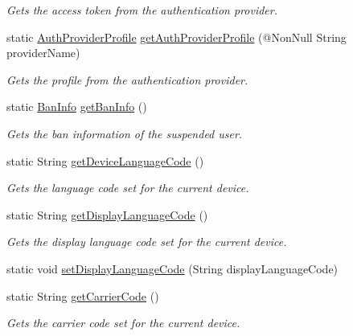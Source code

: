 \begin{DoxyCompactItemize}
\begin{DoxyCompactList}\small\item\em Gets the access token from the authentication provider. \end{DoxyCompactList}\item 
static \hyperlink{classcom_1_1toast_1_1android_1_1gamebase_1_1base_1_1auth_1_1_auth_provider_profile}{Auth\+Provider\+Profile} \hyperlink{classcom_1_1toast_1_1android_1_1gamebase_1_1_gamebase_abfa260ed922444ef35f23f8ac847b4f8}{get\+Auth\+Provider\+Profile} (@Non\+Null String provider\+Name)
\begin{DoxyCompactList}\small\item\em Gets the profile from the authentication provider. \end{DoxyCompactList}\item 
static \hyperlink{classcom_1_1toast_1_1android_1_1gamebase_1_1auth_1_1data_1_1_ban_info}{Ban\+Info} \hyperlink{classcom_1_1toast_1_1android_1_1gamebase_1_1_gamebase_a61447d8f3f3a655ea83649465da9df62}{get\+Ban\+Info} ()
\begin{DoxyCompactList}\small\item\em Gets the ban information of the suspended user. \end{DoxyCompactList}\item 
static String \hyperlink{classcom_1_1toast_1_1android_1_1gamebase_1_1_gamebase_a9816db7baf613297601e327207cda02d}{get\+Device\+Language\+Code} ()
\begin{DoxyCompactList}\small\item\em Gets the language code set for the current device. \end{DoxyCompactList}\item 
static String \hyperlink{classcom_1_1toast_1_1android_1_1gamebase_1_1_gamebase_a93d37838d5b242ed96a6bbd2f024c714}{get\+Display\+Language\+Code} ()
\begin{DoxyCompactList}\small\item\em Gets the display language code set for the current device. \end{DoxyCompactList}\item 
static void \hyperlink{classcom_1_1toast_1_1android_1_1gamebase_1_1_gamebase_a77c9364a742c9ec00eb104e7e3b159f6}{set\+Display\+Language\+Code} (String display\+Language\+Code)
\item 
static String \hyperlink{classcom_1_1toast_1_1android_1_1gamebase_1_1_gamebase_aea83ba0122198c967d745bb4b8d97215}{get\+Carrier\+Code} ()
\begin{DoxyCompactList}\small\item\em Gets the carrier code set for the current device. \end{DoxyCompactList}\item 

\end{DoxyCompactItemize}
